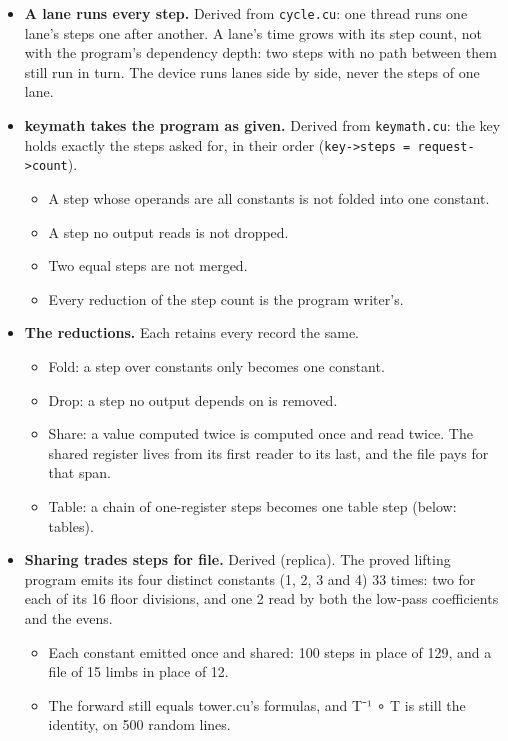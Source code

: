 \begin{itemize}
\item \textbf{A lane runs every step.} Derived from \texttt{cycle.\allowbreak{}cu}: one thread runs one lane's steps one after another. A lane's time grows with its step count, not with the program's dependency depth: two steps with no path between them still run in turn. The device runs lanes side by side, never the steps of one lane.
\item \textbf{keymath takes the program as given.} Derived from \texttt{keymath.\allowbreak{}cu}: the key holds exactly the steps asked for, in their order (\texttt{key-\allowbreak{}>steps = request-\allowbreak{}>count}).

\begin{itemize}
\item A step whose operands are all constants is not folded into one constant.
\item A step no output reads is not dropped.
\item Two equal steps are not merged.
\item Every reduction of the step count is the program writer's.
\end{itemize}
\item \textbf{The reductions.} Each retains every record the same.

\begin{itemize}
\item Fold: a step over constants only becomes one constant.
\item Drop: a step no output depends on is removed.
\item Share: a value computed twice is computed once and read twice. The shared register lives from its first reader to its last, and the file pays for that span.
\item Table: a chain of one-register steps becomes one table step (below: tables).
\end{itemize}
\item \textbf{Sharing trades steps for file.} Derived (replica). The proved lifting program emits its four distinct constants (1, 2, 3 and 4) 33 times: two for each of its 16 floor divisions, and one 2 read by both the low-pass coefficients and the evens.

\begin{itemize}
\item Each constant emitted once and shared: 100 steps in place of 129, and a file of 15 limbs in place of 12.
\item The forward still equals tower.cu's formulas, and T⁻¹ ∘ T is still the identity, on 500 random lines.
\end{itemize}
\end{itemize}

